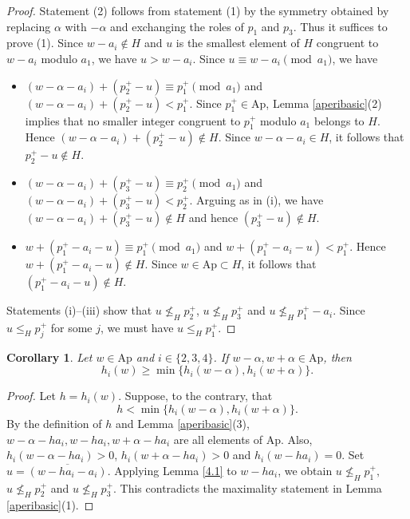 \documentclass[12pt]{amsart}
\numberwithin{equation}{section}
\newtheorem{corollary}[theorem]{Corollary}
\theoremstyle{definition}
\newcommand{\Ap}{\mathrm{Ap}}
\begin{document}
\begin{proof}
Statement (2) follows from statement (1) by the symmetry obtained by
replacing $\alpha$ with $-\alpha$ and exchanging the roles of
$p_1$ and $p_3$.
Thus it suffices to prove (1).
Since $w-a_i\notin H$ and $u$ is the smallest element of $H$
congruent to $w-a_i$ modulo $a_1$, we have
$u>w-a_i$.
Since $u\equiv w-a_i \pmod {a_1}$, we have
    \begin{itemize}
       \item [(i)] $(w-\alpha-a_i) +(p_2^+-u) \equiv p_1^+ \pmod {a_1}$ and $(w-\alpha-a_i) +(p_2^+-u) < p_1^+$.
        Since $p_1^+\in\Ap$, Lemma \ref{aperibasic}(2) implies that no
smaller integer congruent to $p_1^+$ modulo $a_1$ belongs to $H$.
Hence  $(w-\alpha -a_i)+(p_2^+-u) \not \in H$.
        Since $w-\alpha-a_i \in H$, it follows that $p_2^+-u \not \in H.$
       \item [(ii)] $(w-\alpha-a_i) +(p_3^+-u) \equiv p_2^+ \pmod {a_1}$ and $(w-\alpha-a_i) +(p_3^+-u) < p_2^+$.  Arguing as in (i), we have $(w-\alpha -a_i)+(p_3^+-u) \not \in H$ and hence $(p_3^+-u) \not \in H$.
       \item[(iii)] $w +(p_1^+-a_i-u) \equiv p_1^+ \pmod {a_1}$ and $w +(p_1^+-a_i-u) <p_1^+$.
Hence $w+(p_1^+-a_i-u) \not \in H$.
Since $w \in \Ap \subset H$, it follows that  $(p_1^+-a_i-u) \not \in H$.
    \end{itemize}
Statements (i)--(iii) show that $u \not \leq_H p_2^+$, $u \not \leq_H p_3^+$ and $u \not \leq_H p_1^+-a_i$.
Since $u\leq_H p_j^+$ for some $j$,
we must have $u\leq_H p_1^+$.
\end{proof}


\begin{corollary}
\label{cor4}
Let $w\in\Ap$ and $i\in\{2,3,4\}$.
If $w-\alpha,w+\alpha\in \Ap$, then
\[
h_i(w) \geq \min \{h_i(w-\alpha),h_i(w+\alpha)\}.
\]
\end{corollary}

\begin{proof}
Let $h=h_i(w)$.
Suppose, to the contrary, that
\[h< \min\{h_i(w-\alpha),h_i(w+\alpha)\}.\]
By the definition of $h$ and Lemma \ref{aperibasic}(3),
$w-\alpha-h a_i,w-ha_i,w+\alpha-ha_i$ are all elements of $\Ap$.
Also, 
$h_i(w-\alpha-h
a_i)>0$, $h_i(w+\alpha-h a_i)>0$ and $h_i(w-ha_i)=0$.
Set $u=\overline {(w-ha_i-a_i)}$.
Applying Lemma \ref{4.1} to $w-ha_i$, we obtain $u \not \leq_H p_1^+,$ $u \not \leq_H p_2^+$ and $u \not \leq_H p_3^+$.
This contradicts the maximality statement in
Lemma \ref{aperibasic}(1).
\end{proof}
\end{document}

